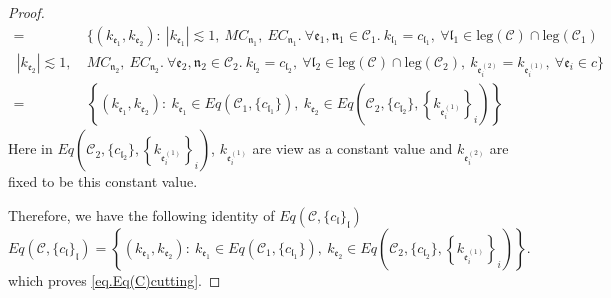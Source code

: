 \begin{proof}
\begin{equation}
\begin{split}
        =&\{(k_{\mathfrak{e}_1},k_{\mathfrak{e}_2}):\ |k_{\mathfrak{e}_1}| \lesssim 1,\ MC_{\mathfrak{n}_1},\  EC_{\mathfrak{n}_1}.\ \forall \mathfrak{e}_1, \mathfrak{n}_1\in\mathcal{C}_1.\ k_{\mathfrak{l}_1}=c_{\mathfrak{l}_1},\ \forall \mathfrak{l}_1\in \text{leg}(\mathcal{C})\cap \text{leg}(\mathcal{C}_1)
        \\
        \ |k_{\mathfrak{e}_2}| \lesssim 1,\ &MC_{\mathfrak{n}_2},\  EC_{\mathfrak{n}_2}.\ \forall \mathfrak{e}_2, \mathfrak{n}_2\in\mathcal{C}_2.\ k_{\mathfrak{l}_2}=c_{\mathfrak{l}_2},\ \forall \mathfrak{l}_2\in \text{leg}(\mathcal{C})\cap \text{leg}(\mathcal{C}_2),\ k_{\mathfrak{e}_{i}^{(2)}}=k_{\mathfrak{e}_{i}^{(1)}},\ \forall\mathfrak{e}_{i}\in c\}
        \\
        =&\left\{(k_{\mathfrak{e}_1},k_{\mathfrak{e}_{2}}):\ k_{\mathfrak{e}_1}\in Eq(\mathcal{C}_1,\{c_{\mathfrak{l}_1}\}),\  k_{\mathfrak{e}_{2}}\in Eq\left(\mathcal{C}_{2}, \{c_{\mathfrak{l}_2}\}, \left\{k_{\mathfrak{e}_{i}^{(1)}}\right\}_{i}\right)\right\}
    \end{split}
\end{equation}
Here in $Eq\left(\mathcal{C}_{2}, \{c_{\mathfrak{l}_2}\}, \left\{k_{\mathfrak{e}_{i}^{(1)}}\right\}_{i}\right)$, $k_{\mathfrak{e}_{i}^{(1)}}$ are view as a constant value and $k_{\mathfrak{e}_{i}^{(2)}}$ are fixed to be this constant value.

Therefore, we have the following identity of $Eq(\mathcal{C},\{c_{\mathfrak{l}}\}_{\mathfrak{l}})$
\begin{equation}
    Eq(\mathcal{C},\{c_{\mathfrak{l}}\}_{\mathfrak{l}})=\left\{(k_{\mathfrak{e}_1},k_{\mathfrak{e}_{2}}):\ k_{\mathfrak{e}_1}\in Eq(\mathcal{C}_1,\{c_{\mathfrak{l}_1}\}),\  k_{\mathfrak{e}_{2}}\in Eq\left(\mathcal{C}_{2}, \{c_{\mathfrak{l}_2}\}, \left\{k_{\mathfrak{e}_{i}^{(1)}}\right\}_{i}\right)\right\}.
\end{equation}
which proves \eqref{eq.Eq(C)cutting}.


\end{proof}
